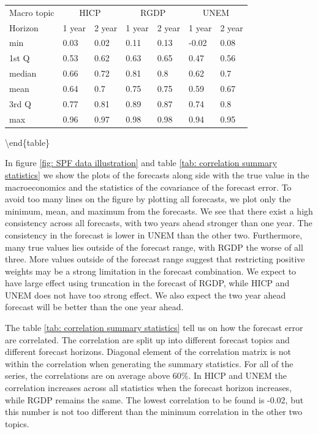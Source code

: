 \documentclass[]{article}
\begin{document}
\begin{tabular}{lllllll}
\hline
Macro topic & \multicolumn{2}{c}{HICP} & \multicolumn{2}{c}{RGDP} & \multicolumn{2}{c}{UNEM} \\
Horizon     & 1 year & 2 year & 1 year & 2 year & 1 year & 2 year \\ \hline
min         & 0.03        & 0.02        & 0.11        & 0.13        & -0.02        & 0.08       \\
1st Q       & 0.53        & 0.62        & 0.63        & 0.65        & 0.47         & 0.56       \\
median      & 0.66        & 0.72        & 0.81        & 0.8         & 0.62         & 0.7        \\
mean        & 0.64        & 0.7         & 0.75        & 0.75        & 0.59         & 0.67       \\
3rd Q       & 0.77        & 0.81        & 0.89        & 0.87        & 0.74         & 0.8        \\
max         & 0.96        & 0.97        & 0.98        & 0.98        & 0.94         & 0.95       \\ 
\hline
\end{tabular}

\textbackslash{}end\{table\}

In figure \ref{fig: SPF data illustration} and table
\ref{tab: correlation summary statistics} we show the plots of the
forecasts along side with the true value in the macroeconomics and the
statistics of the covariance of the forecast error. To avoid too many
lines on the figure by plotting all forecasts, we plot only the minimum,
mean, and maximum from the forecasts. We see that there exist a high
consistency across all forecasts, with two years ahead stronger than one
year. The consistency in the forecast is lower in UNEM than the other
two. Furthermore, many true values lies outside of the forecast range,
with RGDP the worse of all three. More values outside of the forecast
range suggest that restricting positive weights may be a strong
limitation in the forecast combination. We expect to have large effect
using truncation in the forecast of RGDP, while HICP and UNEM does not
have too strong effect. We also expect the two year ahead forecast will
be better than the one year ahead.

The table \ref{tab: correlation summary statistics} tell us on how the
forecast error are correlated. The correlation are split up into
different forecast topics and different forecast horizons. Diagonal
element of the correlation matrix is not within the correlation when
generating the summary statistics. For all of the series, the
correlations are on average above 60\%. In HICP and UNEM the correlation
increases across all statistics when the forecast horizon increases,
while RGDP remains the same. The lowest correlation to be found is
-0.02, but this number is not too different than the minimum correlation
in the other two topics.
\end{document}
